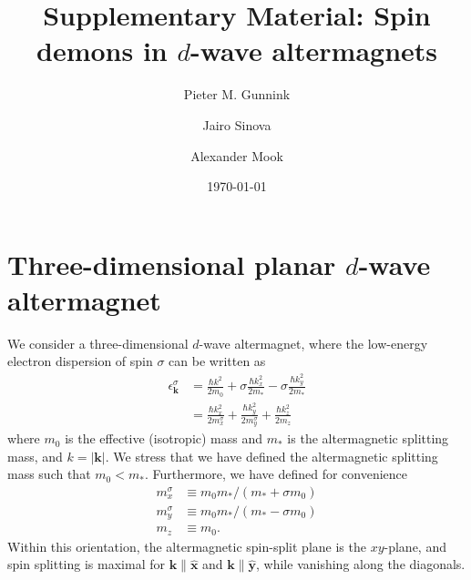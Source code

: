 \documentclass[aps,prb,reprint,twocolumns,superscriptaddress,nofootinbib]{revtex4-2}
\newcommand{\xx}{\hat{\bm{x}}}
\newcommand{\yy}{\hat{\bm{y}}}
\begin{document}
	\title{Supplementary Material: Spin demons in $d$-wave altermagnets}
	\date{\today}
	
	\author{Pieter M. Gunnink}
	\author{Jairo Sinova}
	\author{Alexander Mook}
	\address{Johannes Gutenberg University Mainz, Staudingerweg 7, Mainz 55128, Germany}
	\begin{abstract}
		
	\end{abstract}
	
	\maketitle
	
	
	
	\section{Three-dimensional planar $d$-wave altermagnet}
	We consider a three-dimensional $d$-wave altermagnet, where the low-energy electron dispersion of spin $\sigma$ can be written as \cite{smejkalEmergingResearchLandscape2022,smejkalAnomalousHallAntiferromagnets2022}
	\begin{align}
		\epsilon_{\bm k}^\sigma &= \frac{\hbar k^2}{2m_0} + \sigma \frac{\hbar k_x^2}{2m_*} - \sigma \frac{\hbar k_y^2}{2m_*} \\
		&=\frac{\hbar k_x^2}{2m_x^\sigma}+ \frac{\hbar k_y^2}{2m_y^\sigma} +\frac{\hbar k_z^2}{2m_z}
	\end{align}
	where $m_0$ is the effective (isotropic) mass and $m_*$ is the altermagnetic splitting mass, and $k=|\bm k|$. We stress that we have defined the altermagnetic splitting mass such that $m_0<m_*$. Furthermore, we have defined for convenience
	\begin{align}
		m_x^\sigma &\equiv m_0 m_* / (m_*+\sigma m_0) \label{eq:my} \\
		m_y^\sigma&\equiv m_0 m_* / (m_*-\sigma m_0)  \label{eq:mx}\\ 
		m_z&\equiv m_0.
	\end{align} 
	Within this orientation, the altermagnetic spin-split plane is the $xy$-plane, and spin splitting is maximal for $\bm k \parallel \xx$ and $\bm k \parallel \yy$, while vanishing along the diagonals.
	
\end{document}
